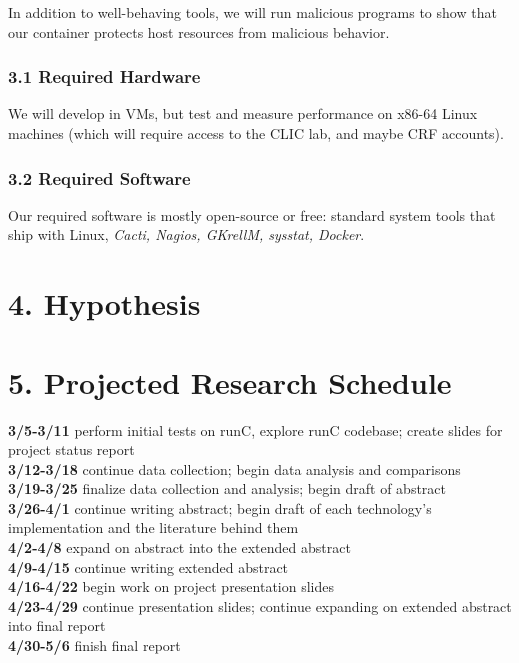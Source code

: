 \documentclass{proc}
\begin{document}
In addition to well-behaving tools, we will run malicious programs to show that our container protects host resources from malicious behavior.

\subsubsection*{3.1 Required Hardware}
We will develop in VMs, but test and measure performance on x86-64 Linux machines (which will require access to the CLIC lab, and maybe CRF accounts).

\subsubsection*{3.2 Required Software}
Our required software is mostly open-source or free: standard system tools that ship with Linux, \emph{Cacti, Nagios, GKrellM, sysstat, Docker}.

\section*{4. Hypothesis}



\section*{5. Projected Research Schedule}
\textbf{3/5-3/11} perform initial tests on runC, explore runC codebase; create slides for project status report\\
\textbf{3/12-3/18} continue data collection; begin data analysis and comparisons\\
\textbf{3/19-3/25} finalize data collection and analysis; begin draft of abstract\\
\textbf{3/26-4/1} continue writing abstract; begin draft of each technology's implementation and the literature behind them\\
\textbf{4/2-4/8} expand on abstract into the extended abstract\\
\textbf{4/9-4/15} continue writing extended abstract\\
\textbf{4/16-4/22} begin work on project presentation slides\\
\textbf{4/23-4/29} continue presentation slides; continue expanding on extended abstract into final report\\
\textbf{4/30-5/6} finish final report






\end{document}
